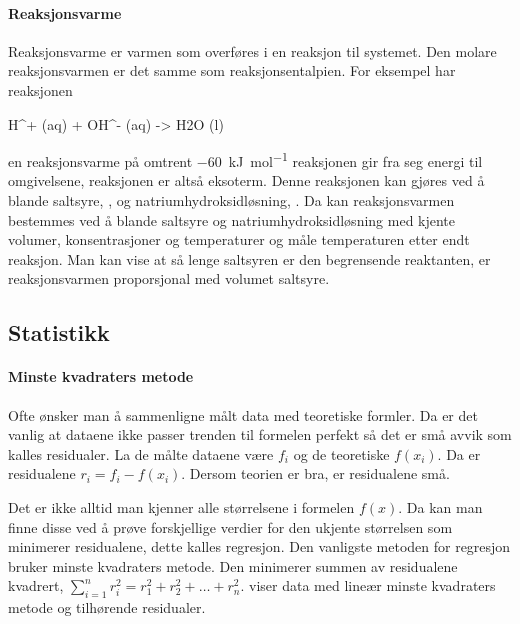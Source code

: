	\paragraph{Reaksjonsvarme}
	Reaksjonsvarme er varmen som overføres i en reaksjon til systemet.
	Den molare reaksjonsvarmen er det samme som reaksjonsentalpien.
	For eksempel har reaksjonen
	\begin{reaction}
		H^+ (aq) + OH^- (aq) -> H2O (l) \label{rxn:neu}
	\end{reaction}
	en reaksjonsvarme på omtrent \SI{-60}{\kilo\joule\per\mole} reaksjonen gir fra seg energi til omgivelsene, reaksjonen er altså eksoterm.
	Denne reaksjonen kan gjøres ved å blande saltsyre, , og natriumhydroksidløsning, .
	Da kan reaksjonsvarmen bestemmes ved å blande saltsyre og natriumhydroksidløsning med kjente volumer, konsentrasjoner og temperaturer og måle temperaturen etter endt reaksjon.
	Man kan vise at så lenge saltsyren er den begrensende reaktanten, er reaksjonsvarmen proporsjonal med volumet saltsyre.
	
	\subsection{Statistikk}
	
	\paragraph{Minste kvadraters metode}
	Ofte ønsker man å sammenligne målt data med teoretiske formler.
	Da er det vanlig at dataene ikke passer trenden til formelen perfekt så det er små avvik som kalles residualer.
	La de målte dataene være $f_i$ og de teoretiske $f(x_i)$.
	Da er residualene $r_i=f_i-f(x_i)$.
	Dersom teorien er bra, er residualene små.
	
	Det er ikke alltid man kjenner alle størrelsene i formelen $f(x)$.
	Da kan man finne disse ved å prøve forskjellige verdier for den ukjente størrelsen som minimerer residualene, dette kalles regresjon.
	Den vanligste metoden for regresjon bruker minste kvadraters metode.
	Den minimerer summen av residualene kvadrert, $\sum_{i=1}^n r_i^2 = r_1^2+r_2^2+\ldots+r_n^2$.
	 viser data med lineær minste kvadraters metode og tilhørende residualer.
	

